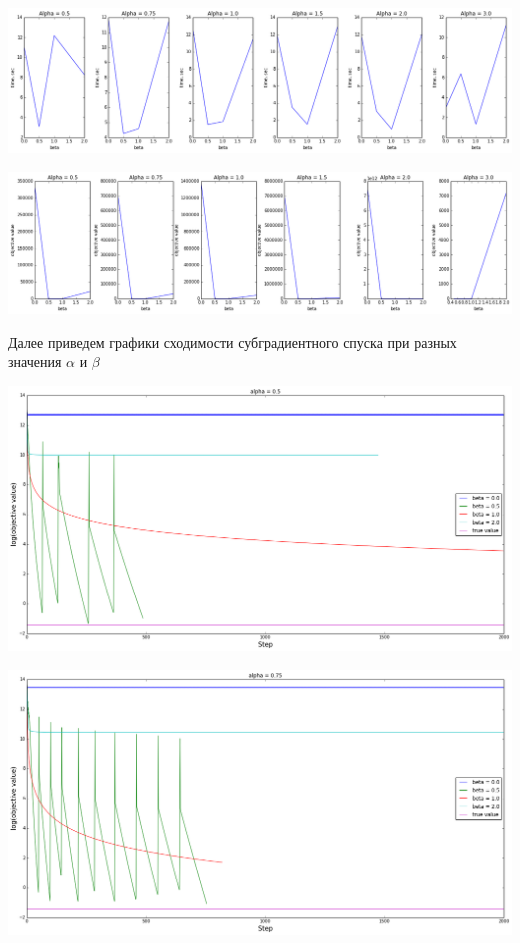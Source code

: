 \documentclass[12pt, a4paper]{article}
\begin{document}
			\begin{center}
				\includegraphics[width=18cm]{4par.png}
			\end{center}

			\begin{center}
				\includegraphics[width=18cm]{4par_obj.png}
			\end{center}

			Далее приведем графики сходимости субградиентного спуска при разных значения $\alpha$ и $\beta$

			\begin{center}
				\includegraphics[width=16cm]{4par_05.png}
			\end{center}

			\begin{center}
				\includegraphics[width=16cm]{4par_075.png}
			\end{center}
\end{document}
